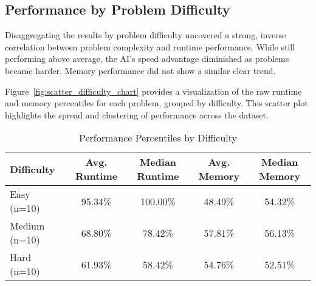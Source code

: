 \documentclass[12pt, a4paper]{article}
\begin{document}
\subsection{Performance by Problem Difficulty}
Disaggregating the results by problem difficulty uncovered a strong, inverse correlation between problem complexity and runtime performance. While still performing above average, the AI's speed advantage diminished as problems became harder. Memory performance did not show a similar clear trend.

Figure~\ref{fig:scatter_difficulty_chart} provides a visualization of the raw runtime and memory percentiles for each problem, grouped by difficulty. This scatter plot highlights the spread and clustering of performance across the dataset.

\begin{table}[h!]
\centering
\caption{Performance Percentiles by Difficulty}
\label{tab:difficulty_performance}
\begin{tabular}{@{}lcccc@{}}
\toprule
\textbf{Difficulty} & \textbf{Avg. Runtime} & \textbf{Median Runtime} & \textbf{Avg. Memory} & \textbf{Median Memory} \\ \midrule
Easy (n=10)   & 95.34\% & 100.00\% & 48.49\% & 54.32\% \\
Medium (n=10) & 68.80\% & 78.42\% & 57.81\% & 56.13\% \\
Hard (n=10)   & 61.93\% & 58.42\% & 54.76\% & 52.51\% \\ \bottomrule
\end{tabular}
\end{table}
\end{document}
